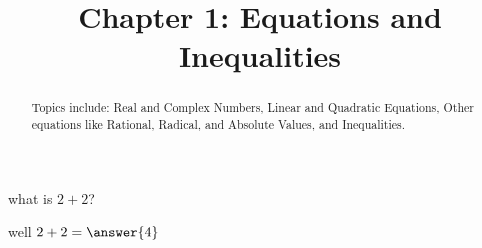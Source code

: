 \documentclass[handout]{ximera}
\title{Chapter 1: Equations and Inequalities}
\begin{document}
\begin{abstract}
	Topics include: Real and Complex Numbers, Linear and Quadratic Equations, Other equations like Rational, Radical, and Absolute Values, and Inequalities.
	
\end{abstract}
\maketitle

\begin{problem}
what is $2+2$?

well $2+2=\answer{4}$
\end{problem}
\end{document}
